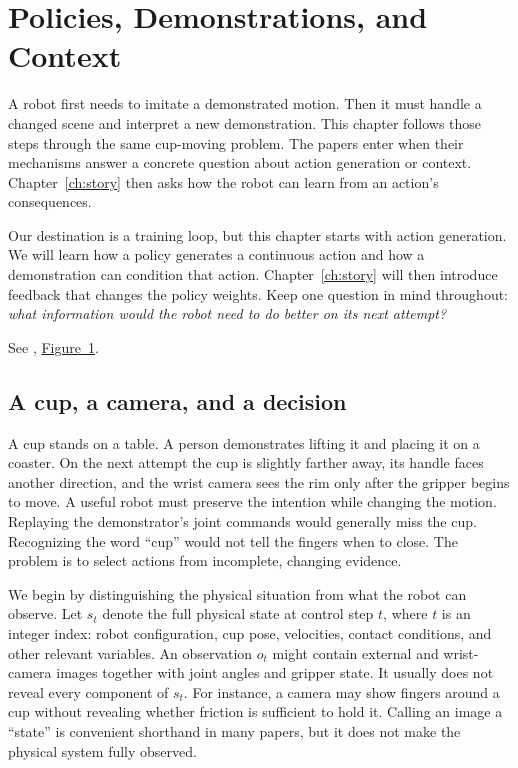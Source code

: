 \chapter{Policies, Demonstrations, and Context}
\label{ch:policy}

A robot first needs to imitate a demonstrated motion. Then it must handle a changed scene and interpret a new demonstration. This chapter follows those steps through the same cup-moving problem. The papers enter when their mechanisms answer a concrete question about action generation or context. Chapter~\ref{ch:story} then asks how the robot can learn from an action's consequences.

Our destination is a training loop, but this chapter starts with action generation. We will learn how a policy generates a continuous action and how a demonstration can condition that action. Chapter~\ref{ch:story} will then introduce feedback that changes the policy weights. Keep one question in mind throughout: \emph{what information would the robot need to do better on its next attempt?}

\noindent See \citet{pi0}, \href{https://arxiv.org/pdf/2410.24164v1}{Figure~1}.


\section{A cup, a camera, and a decision}
A cup stands on a table. A person demonstrates lifting it and placing it on a coaster. On the next attempt the cup is slightly farther away, its handle faces another direction, and the wrist camera sees the rim only after the gripper begins to move. A useful robot must preserve the intention while changing the motion. Replaying the demonstrator's joint commands would generally miss the cup. Recognizing the word ``cup'' would not tell the fingers when to close. The problem is to select actions from incomplete, changing evidence.

We begin by distinguishing the physical situation from what the robot can observe. Let $s_t$ denote the full physical state at control step $t$, where $t$ is an integer index: robot configuration, cup pose, velocities, contact conditions, and other relevant variables. An observation $o_t$ might contain external and wrist-camera images together with joint angles and gripper state. It usually does not reveal every component of $s_t$. For instance, a camera may show fingers around a cup without revealing whether friction is sufficient to hold it. Calling an image a ``state'' is convenient shorthand in many papers, but it does not make the physical system fully observed.

